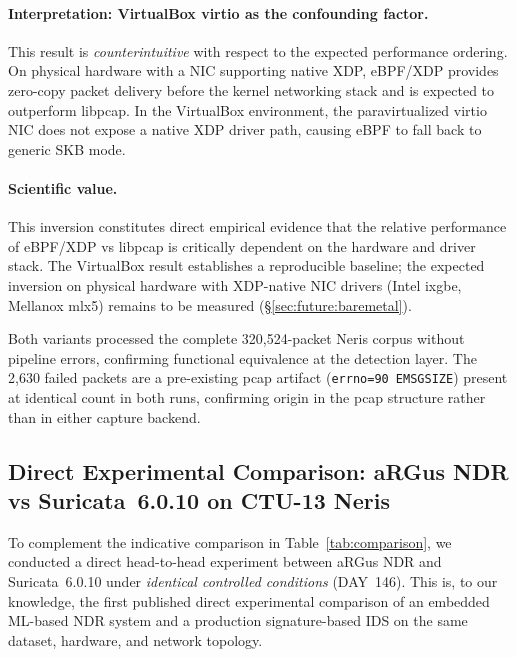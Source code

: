 \documentclass[11pt,a4paper]{article}
\begin{document}
    \paragraph{Interpretation: VirtualBox virtio as the confounding factor.}
    This result is \emph{counterintuitive} with respect to the expected
    performance ordering. On physical hardware with a NIC supporting native
    XDP, eBPF/XDP provides zero-copy packet delivery before the kernel
    networking stack and is expected to outperform libpcap. In the VirtualBox
    environment, the paravirtualized virtio NIC does not expose a native XDP
    driver path, causing eBPF to fall back to generic SKB mode.

    \paragraph{Scientific value.}
    This inversion constitutes direct empirical evidence that the relative
    performance of eBPF/XDP vs libpcap is critically dependent on the hardware
    and driver stack. The VirtualBox result establishes a reproducible baseline;
    the expected inversion on physical hardware with XDP-native NIC drivers
    (Intel ixgbe, Mellanox mlx5) remains to be measured
    (\S\ref{sec:future:baremetal}).

    Both variants processed the complete 320,524-packet Neris corpus
    without pipeline errors, confirming functional equivalence at the
    detection layer. The 2,630 failed packets are a pre-existing pcap
    artifact (\texttt{errno=90~EMSGSIZE}) present at identical count in both
    runs, confirming origin in the pcap structure rather than in either
    capture backend.

    \subsection{Direct Experimental Comparison: aRGus NDR vs Suricata~6.0.10 on CTU-13 Neris}
    \label{sec:eval:suricata}

    To complement the indicative comparison in Table~\ref{tab:comparison}, we conducted a
    direct head-to-head experiment between aRGus NDR and Suricata~6.0.10 under
    \emph{identical controlled conditions} (DAY~146). This is, to our knowledge, the first
    published direct experimental comparison of an embedded ML-based NDR system and a
    production signature-based IDS on the same dataset, hardware, and network topology.
\end{document}
